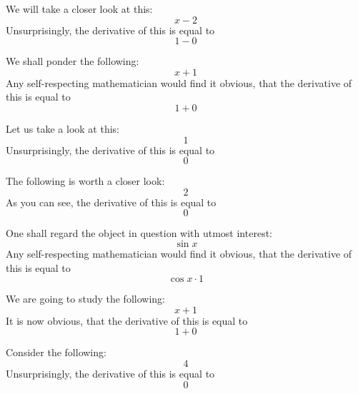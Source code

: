 \documentclass{article}
\begin{document}
We will take a closer look at this:
\begin{equation}
x - 2 
\end{equation}
Unsurprisingly, the derivative of this is equal to
\begin{equation}
1 - 0 
\end{equation}

We shall ponder the following:
\begin{equation}
x + 1 
\end{equation}
Any self-respecting mathematician would find it obvious, that the derivative of this is equal to
\begin{equation}
1 + 0 
\end{equation}

Let us take a look at this:
\begin{equation}
1 
\end{equation}
Unsurprisingly, the derivative of this is equal to
\begin{equation}
0 
\end{equation}

The following is worth a closer look:
\begin{equation}
2 
\end{equation}
As you can see, the derivative of this is equal to
\begin{equation}
0 
\end{equation}

One shall regard the object in question with utmost interest:
\begin{equation}
\sin x 
\end{equation}
Any self-respecting mathematician would find it obvious, that the derivative of this is equal to
\begin{equation}
\cos x \cdot 1 
\end{equation}

We are going to study the following:
\begin{equation}
x + 1 
\end{equation}
It is now obvious, that the derivative of this is equal to
\begin{equation}
1 + 0 
\end{equation}

Consider the following:
\begin{equation}
4 
\end{equation}
Unsurprisingly, the derivative of this is equal to
\begin{equation}
0 
\end{equation}
\end{document}

